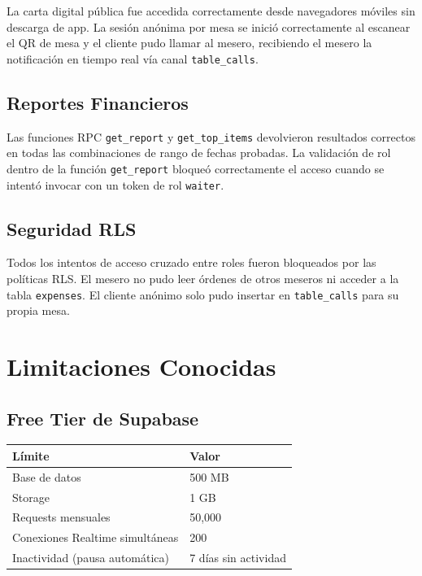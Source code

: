 La carta digital pública fue accedida correctamente desde navegadores móviles
sin descarga de app. La sesión anónima por mesa se inició correctamente al
escanear el QR de mesa y el cliente pudo llamar al mesero, recibiendo el mesero
la notificación en tiempo real vía canal \texttt{table\_calls}.

\subsection{Reportes Financieros}

Las funciones RPC \texttt{get\_report} y \texttt{get\_top\_items} devolvieron
resultados correctos en todas las combinaciones de rango de fechas probadas.
La validación de rol dentro de la función \texttt{get\_report} bloqueó
correctamente el acceso cuando se intentó invocar con un token de rol
\texttt{waiter}.

\subsection{Seguridad RLS}

Todos los intentos de acceso cruzado entre roles fueron bloqueados por las
políticas RLS. El mesero no pudo leer órdenes de otros meseros ni acceder
a la tabla \texttt{expenses}. El cliente anónimo solo pudo insertar en
\texttt{table\_calls} para su propia mesa.

\section{Limitaciones Conocidas}

\subsection{Free Tier de Supabase}

\begin{center}
\begin{tabular}{ll}
  \toprule
  \textbf{Límite} & \textbf{Valor} \\
  \midrule
  Base de datos                      & 500 MB \\
  Storage                            & 1 GB \\
  Requests mensuales                 & 50,000 \\
  Conexiones Realtime simultáneas    & 200 \\
  Inactividad (pausa automática)     & 7 días sin actividad \\
  \bottomrule
\end{tabular}
\end{center}

